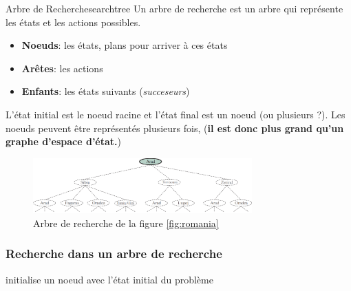 \documentclass[a4paper, 12pt]{extarticle}
\begin{document}
\begin{definition}{Arbre de Recherche}{searchtree}
    Un arbre de recherche est un arbre qui représente les états et les actions possibles.
    \begin{itemize}
        \item \textbf{Noeuds}: les états, plans pour arriver à ces états
        \item \textbf{Arêtes}: les actions
        \item \textbf{Enfants}: les états suivants (\textit{succeseurs})
    \end{itemize} 
    L'état initial est le noeud racine et l'état final est un noeud (ou plusieurs ?). 
    Les noeuds peuvent être représentés plusieurs fois, (\textbf{il est donc plus grand qu'un graphe d'espace d'état.})
\end{definition}

\begin{figure}[H]
    \begin{center}
        \includegraphics[width=0.75\textwidth]{./pictures/romst.png}
    \end{center}
    \caption{Arbre de recherche de la figure \ref{fig:romania}}\label{fig:romst}
\end{figure}

\subsubsection{Recherche dans un arbre de recherche} %
\label{sec:recherche_dans_un_arbre_de_recherche}

\begin{algorithm}[H]
    \caption{Algorithme de recherche}\label{alg:stsearch}
    \begin{algorithmic}
        \State initialise un noeud avec l'état initial du problème

        \EndLoop
        \EndFunction
    \end{algorithmic}
\end{algorithm}
\end{document}
